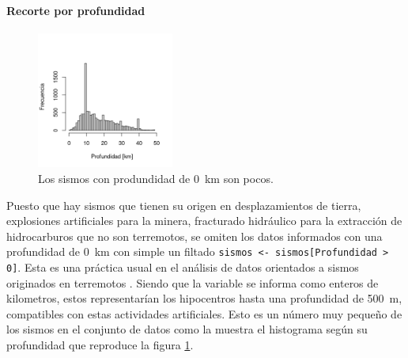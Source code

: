 \documentclass[a4paper]{report}
\begin{document}
\paragraph{Recorte por profundidad}

\begin{figure}
	\includegraphics[width=0.4\textwidth]{histograma_profundidad_menos50.png}
	\caption{Los sismos con produndidad de \SI{0}{km} son pocos.}
	\label{fig:histograma_profundidad}
\end{figure}

Puesto que hay sismos que tienen su origen en desplazamientos de tierra, explosiones artificiales para la minera, fracturado hidráulico para la extracción de hidrocarburos que no son terremotos, se omiten los datos informados con una profundidad de \SI{0}{\kilo\metre} con simple un filtado \verb'sismos <- sismos[Profundidad > 0]'.
Esta es una práctica usual en el análisis de datos orientados a sismos originados en terremotos \cite{hu_applying_2024}.
Siendo que la variable se informa como enteros de kilometros, estos representarían los hipocentros hasta una profundidad de \SI{500}{\metre}, compatibles con estas actividades artificiales.
Esto es un número muy pequeño de los sismos en el conjunto de datos como la muestra el histograma según su profundidad que reproduce la figura \ref{fig:histograma_profundidad}.
\end{document}
